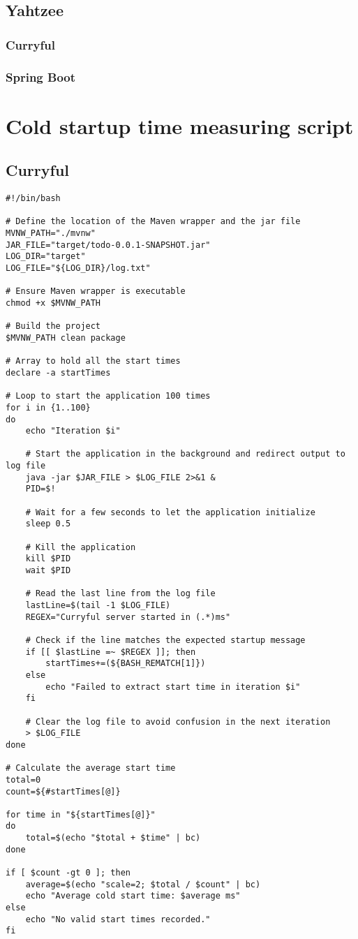 \documentclass[a4paper,titlepage]{article}
\begin{document}
\subsection{Yahtzee}
\subsubsection{Curryful}
\subsubsection{Spring Boot}

\section{Cold startup time measuring script}
\subsection{Curryful}
\begin{lstlisting}
#!/bin/bash

# Define the location of the Maven wrapper and the jar file
MVNW_PATH="./mvnw"
JAR_FILE="target/todo-0.0.1-SNAPSHOT.jar"
LOG_DIR="target"
LOG_FILE="${LOG_DIR}/log.txt"

# Ensure Maven wrapper is executable
chmod +x $MVNW_PATH

# Build the project
$MVNW_PATH clean package

# Array to hold all the start times
declare -a startTimes

# Loop to start the application 100 times
for i in {1..100}
do
	echo "Iteration $i"

	# Start the application in the background and redirect output to log file
	java -jar $JAR_FILE > $LOG_FILE 2>&1 &
	PID=$!

	# Wait for a few seconds to let the application initialize
	sleep 0.5

	# Kill the application
	kill $PID
	wait $PID

	# Read the last line from the log file
	lastLine=$(tail -1 $LOG_FILE)
	REGEX="Curryful server started in (.*)ms"

	# Check if the line matches the expected startup message
	if [[ $lastLine =~ $REGEX ]]; then
		startTimes+=(${BASH_REMATCH[1]})
	else
		echo "Failed to extract start time in iteration $i"
	fi

	# Clear the log file to avoid confusion in the next iteration
	> $LOG_FILE
done

# Calculate the average start time
total=0
count=${#startTimes[@]}

for time in "${startTimes[@]}"
do
	total=$(echo "$total + $time" | bc)
done

if [ $count -gt 0 ]; then
	average=$(echo "scale=2; $total / $count" | bc)
	echo "Average cold start time: $average ms"
else
	echo "No valid start times recorded."
fi
\end{lstlisting}
\end{document}
